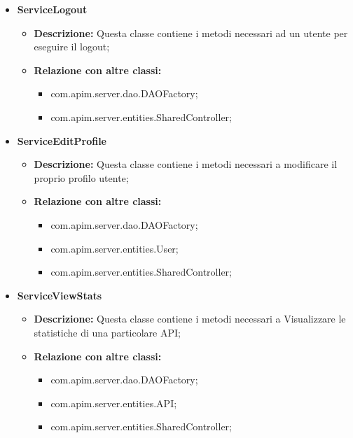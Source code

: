 {{{{\begin{itemize}
\begin{itemize}
\begin{itemize}
              \item com.apim.server.entities.SharedController;
            \end{itemize}
          \end{itemize}
          \item \textbf{ServiceLogout}
          \begin{itemize}
            \item \textbf{Descrizione:} Questa classe contiene i metodi necessari ad un utente per eseguire il logout;
            \item \textbf{Relazione con altre classi:}
            \begin{itemize}
              \item com.apim.server.dao.DAOFactory;
              \item com.apim.server.entities.SharedController;
            \end{itemize}
          \end{itemize}
          \item \textbf{ServiceEditProfile}
          \begin{itemize}
            \item \textbf{Descrizione:} Questa classe contiene i metodi necessari a modificare il proprio profilo utente;
            \item \textbf{Relazione con altre classi:}
            \begin{itemize}
              \item com.apim.server.dao.DAOFactory;
              \item com.apim.server.entities.User;
              \item com.apim.server.entities.SharedController;
            \end{itemize}
          \end{itemize}
          \item \textbf{ServiceViewStats}
          \begin{itemize}
            \item \textbf{Descrizione:} Questa classe contiene i metodi necessari a Visualizzare le statistiche di una particolare API;
            \item \textbf{Relazione con altre classi:}
            \begin{itemize}
              \item com.apim.server.dao.DAOFactory;
              \item com.apim.server.entities.API;
              \item com.apim.server.entities.SharedController;

\end{itemize}
\end{itemize}
\end{itemize}}}}}
